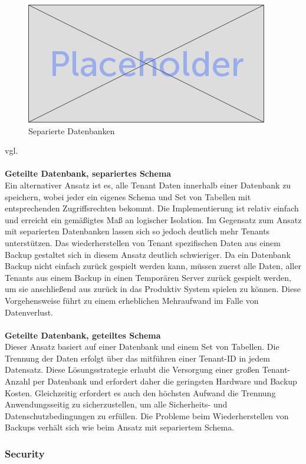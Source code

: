 	\begin{figure}[h]
		\centering
		\includegraphics[width=0.7\linewidth]{images/placeholder}
		\caption{Separierte Datenbanken}
		\label{fig:separierteDatenbanken}
	\end{figure}
vgl.	
\\
\\
\textbf{Geteilte Datenbank, separiertes Schema}\\
Ein alternativer Ansatz ist es, alle Tenant Daten innerhalb einer Datenbank zu speichern, wobei jeder ein eigenes Schema und Set von Tabellen mit entsprechenden Zugriffsrechten bekommt.
Die Implementierung ist relativ einfach und erreicht ein gemäßigtes Maß an logischer Isolation. Im Gegensatz zum Ansatz mit separierten Datenbanken lassen sich so jedoch deutlich mehr Tenants unterstützen. Das wiederherstellen von Tenant spezifischen Daten aus einem Backup gestaltet sich in diesem Ansatz deutlich schwieriger. Da ein Datenbank Backup nicht einfach zurück gespielt werden kann, müssen zuerst alle Daten, aller Tenants aus einem Backup in einen Temporären Server zurück gespielt werden, um sie anschließend aus zurück in das Produktiv System spielen zu können. Diese Vorgehensweise führt zu einem erheblichen Mehraufwand im Falle von Datenverlust.
\\
\\
\textbf{Geteilte Datenbank, geteiltes Schema} \\
Dieser Ansatz basiert auf einer Datenbank und einem Set von Tabellen. Die Trennung der Daten erfolgt über das mitführen einer Tenant-ID in jedem Datensatz. Diese Lösungsstrategie erlaubt die Versorgung einer großen Tenant-Anzahl per Datenbank und erfordert daher die geringsten Hardware und Backup Kosten. Gleichzeitig erfordert es auch den höchsten Aufwand die Trennung Anwendungsseitig zu sicherzustellen, um alle Sicherheits- und Datenschutzbedingungen zu erfüllen. Die Probleme beim Wiederherstellen von Backups verhält sich wie beim Ansatz mit separiertem Schema. 

 
\subsubsection{Security}

